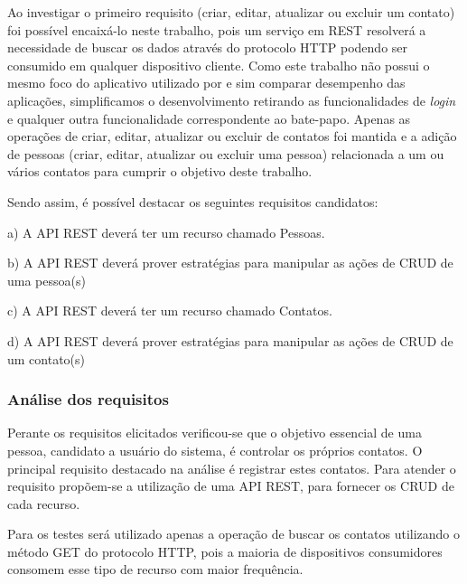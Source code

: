   Ao investigar o primeiro requisito (criar, editar, atualizar ou excluir um contato) foi possível encaixá-lo neste trabalho,
  pois um serviço em REST resolverá a necessidade de buscar os dados através do protocolo HTTP 
  podendo ser consumido em qualquer dispositivo cliente. Como este trabalho não possui o mesmo foco do aplicativo utilizado por 
  e sim comparar desempenho das aplicações, simplificamos o desenvolvimento retirando as funcionalidades
  de \textit{login} e qualquer outra funcionalidade correspondente ao bate-papo. Apenas as operações de criar, editar,
  atualizar ou excluir de contatos foi mantida e a adição de pessoas (criar, editar, atualizar ou excluir uma pessoa)
  relacionada a um ou vários contatos para cumprir o objetivo deste trabalho.

  Sendo assim, é possível destacar os seguintes requisitos candidatos:

  \begin{compactitem}
    \item[a)] A \ac{API} \ac{REST} deverá ter um recurso chamado Pessoas.
    \item[b)] A \ac{API} \ac{REST} deverá prover estratégias para manipular as ações de CRUD de uma pessoa(s)
    \item[c)] A \ac{API} \ac{REST} deverá ter um recurso chamado Contatos.
    \item[d)] A \ac{API} \ac{REST} deverá prover estratégias para manipular as ações de CRUD de um contato(s)
  \end{compactitem}
  
\subsubsection{Análise dos requisitos}
  
  Perante os requisitos elicitados verificou-se que o objetivo essencial de uma pessoa, candidato a usuário
  do sistema, é controlar os próprios contatos.
  O principal requisito destacado na análise é registrar estes contatos. Para atender o requisito
  propõem-se a utilização de uma \ac{API} \ac{REST}, para fornecer os \ac{CRUD} de cada recurso.
  
  Para os testes será utilizado apenas a operação de buscar os contatos utilizando o método GET 
  do protocolo HTTP, pois a maioria de dispositivos consumidores consomem esse tipo de
  recurso com maior frequência.
 
